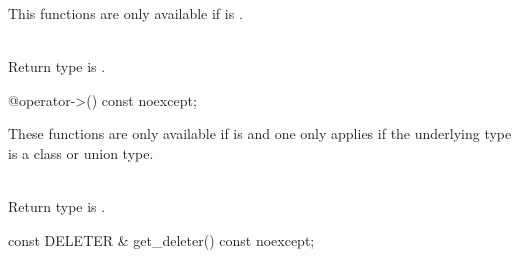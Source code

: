 \documentclass[ebook,11pt,article]{memoir}
\begin{document}
\pnum
\requires This functions are only available if  is . 

\pnum
\returns {}
\\Return type is . 

\begin{itemdecl}
	@\seebelow@  operator->() const noexcept;
\end{itemdecl}

\pnum
\requires These functions are only available if  is  and one only applies if the underlying type is a class or union type.

\pnum
\returns {}
\\Return type is . 

\begin{itemdecl}
	const DELETER & get_deleter() const noexcept;
\end{itemdecl}

\pnum
\returns {}
\end{document}
